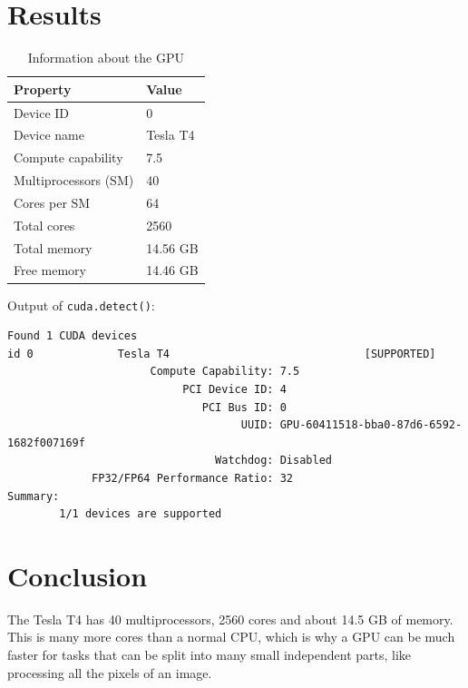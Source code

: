 \documentclass[11pt,a4paper]{article}
\begin{document}
\section{Results}

\begin{table}[h]
\centering
\begin{tabular}{ll}
\toprule
\textbf{Property} & \textbf{Value} \\
\midrule
Device ID          & 0 \\
Device name        & Tesla T4 \\
Compute capability & 7.5 \\
Multiprocessors (SM) & 40 \\
Cores per SM       & 64 \\
Total cores        & 2560 \\
Total memory       & 14.56 GB \\
Free memory        & 14.46 GB \\
\bottomrule
\end{tabular}
\caption{Information about the GPU}
\end{table}

Output of \texttt{cuda.detect()}:

\begin{lstlisting}
Found 1 CUDA devices
id 0             Tesla T4                              [SUPPORTED]
                      Compute Capability: 7.5
                           PCI Device ID: 4
                              PCI Bus ID: 0
                                    UUID: GPU-60411518-bba0-87d6-6592-1682f007169f
                                Watchdog: Disabled
             FP32/FP64 Performance Ratio: 32
Summary:
        1/1 devices are supported
\end{lstlisting}

\section{Conclusion}
The Tesla T4 has 40 multiprocessors, 2560 cores and about 14.5 GB of memory. This is many
more cores than a normal CPU, which is why a GPU can be much faster for tasks that can be
split into many small independent parts, like processing all the pixels of an image.
\end{document}
